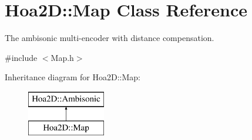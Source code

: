 \hypertarget{class_hoa2_d_1_1_map}{\section{Hoa2\-D\-:\-:Map Class Reference}
\label{class_hoa2_d_1_1_map}
}


The ambisonic multi-\/encoder with distance compensation.  




{\ttfamily \#include $<$Map.\-h$>$}

Inheritance diagram for Hoa2\-D\-:\-:Map\-:\begin{figure}[H]
\begin{center}
\leavevmode
\includegraphics[height=2.000000cm]{class_hoa2_d_1_1_map}
\end{center}
\end{figure}
